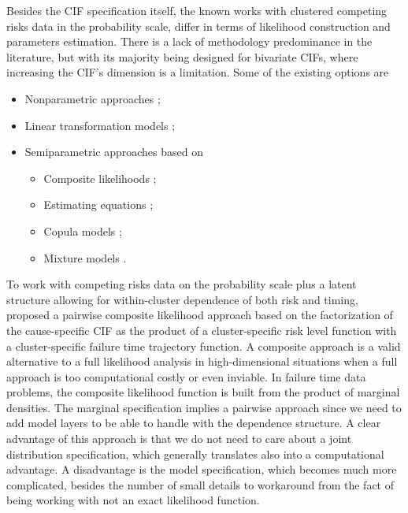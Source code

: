 Besides the CIF specification itself, the known works with clustered
competing risks data in the probability scale, differ in terms of
likelihood construction and parameters estimation. There is a lack of
methodology predominance in the literature, but with its majority being
designed for bivariate CIFs, where increasing the CIF's dimension is a
limitation. Some of the existing options are
\begin{itemize}
 \item Nonparametric approaches \cite{cheng07,cheng09};
 \item Linear transformation models \cite{fine99,gerds12};
 \item Semiparametric approaches based on
  \begin{itemize}
   \item Composite likelihoods \cite{shih,SCHEIKE};
   \item Estimating equations \cite{cheng&fine12,crossoddsratioSCHEIKE};
   \item Copula models \cite{semiparametricSCHEIKE};
   \item Mixture models \cite{naskar05,shi13}.
  \end{itemize}
\end{itemize}

To work with competing risks data on the probability scale plus a latent
structure allowing for within-cluster dependence of both risk and
timing,  proposed a pairwise composite likelihood
approach based on the factorization of the cause-specific CIF as the
product of a cluster-specific risk level function with a
cluster-specific failure time trajectory function. A composite approach
\cite{lindsay88, cox&reid04, varin11} is a valid alternative to a full
likelihood analysis in high-dimensional situations when a full approach
is too computational costly or even inviable. In failure time data
problems, the composite likelihood function is built from the product of
marginal densities. The marginal specification implies a pairwise
approach since we need to add model layers to be able to handle with the
dependence structure. A clear advantage of this approach is that we do
not need to care about a joint distribution specification, which
generally translates also into a computational advantage. A disadvantage
is the model specification, which becomes much more complicated, besides
the number of small details to workaround from the fact of being working
with not an exact likelihood function.

